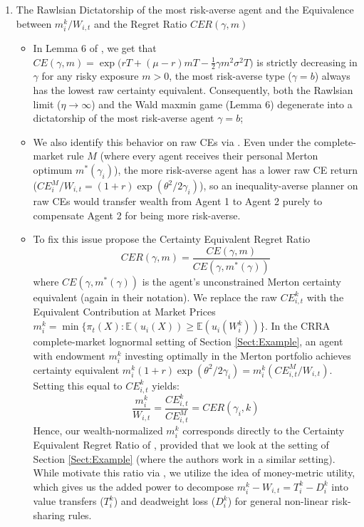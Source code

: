 \documentclass[11pt,a4paper]{article}
\theoremstyle{definition}
\theoremstyle{plain}
\theoremstyle{remark}
\newcommand{\E}{\mathbb{E}}
\newcommand{\1}{\mathbf{1}}
\begin{document}
\begin{enumerate}
\begin{itemize}
    \end{itemize}
    \item The Rawlsian Dictatorship of the most risk-averse agent and the Equivalence between $m_i^k / W_{i,t}$ and the Regret Ratio $CER(\gamma, m)$
    \begin{itemize}
        \item In Lemma 6 of \citet{BalterSchweizer2024}, we get that $CE(\gamma, m) = \exp\big(rT + (\mu-r)mT - \frac{1}{2}\gamma m^2 \sigma^2 T\big)$ is strictly decreasing in $\gamma$ for any risky exposure $m > 0$, the most risk-averse type ($\gamma = b$) always has the lowest raw certainty equivalent. Consequently, both the Rawlsian limit ($\eta \to \infty$) and the Wald maxmin game (Lemma 6) degenerate into a dictatorship of the most risk-averse agent $\gamma = b$;
        \item We also identify this behavior on raw CEs via \citet{FleurbaeyManiquet2011}. Even under the complete-market rule $M$ (where every agent receives their personal Merton optimum $m^*(\gamma_i)$), the more risk-averse agent has a lower raw CE return ($CE_i^M / W_{i,t} = (1+r)\exp(\theta^2 / 2\gamma_i)$), so an inequality-averse planner on raw CEs would transfer wealth from Agent 1 to Agent 2 purely to compensate Agent 2 for being more risk-averse.
        \item To fix this issue \citet{BalterSchweizer2024} propose the Certainty Equivalent Regret Ratio
        \begin{equation*}
            CER(\gamma, m) = \frac{CE(\gamma, m)}{CE(\gamma, m^*(\gamma))}
        \end{equation*}
        where $CE(\gamma, m^*(\gamma))$ is the agent's unconstrained Merton certainty equivalent (again in their notation). We replace the raw $CE_{i,t}^k$ with the Equivalent Contribution at Market Prices $m_i^k = \min\{\pi_t(X) : \E(u_i(X)) \ge \E(u_i(W_i^k))\}$. In the CRRA complete-market lognormal setting of Section \ref{Sect:Example}, an agent with endowment $m_i^k$ investing optimally in the Merton portfolio achieves certainty equivalent $m_i^k (1+r)\exp(\theta^2 / 2\gamma_i) = m_i^k (CE_{i,t}^M / W_{i,t})$. Setting this equal to $CE_{i,t}^k$ yields:
        \begin{equation*}
            \frac{m_i^k}{W_{i,t}} = \frac{CE_{i,t}^k}{CE_{i,t}^M} = CER(\gamma_i, k)
        \end{equation*}
        Hence, our wealth-normalized $m_i^k$ corresponds directly to the Certainty Equivalent Regret Ratio of \citet{BalterSchweizer2024}, provided that we look at the setting of Section \ref{Sect:Example} (where the authors work in a similar setting). While \citet{BalterSchweizer2024} motivate this ratio via \citet{Savage_1972}, we utilize the idea of \citet{FleurbaeyManiquet2011} money-metric utility, which gives us the added power to decompose $m_i^k - W_{i,t} = T_i^k - D_i^k$ into value transfers ($T_i^k$) and deadweight loss ($D_i^k$) for general non-linear risk-sharing rules.
    \end{itemize}
\end{enumerate}
\end{document}
